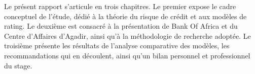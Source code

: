 Le présent rapport s’articule en trois chapitres. Le premier expose le cadre conceptuel de l’étude, dédié à la théorie du risque de crédit et aux modèles de rating. Le deuxième est consacré à la présentation de Bank Of Africa et du Centre d'Affaires d'Agadir, ainsi qu'à la méthodologie de recherche adoptée. Le troisième présente les résultats de l'analyse comparative des modèles, les recommandations qui en découlent, ainsi qu’un bilan personnel et professionnel du stage.